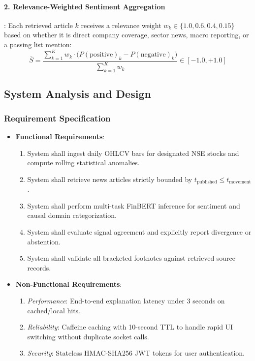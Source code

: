 \documentclass{article}
\begin{document}
	\paragraph{2. Relevance-Weighted Sentiment Aggregation}:
	Each retrieved article $k$ receives a relevance weight $w_k \in \{1.0, 0.6, 0.4, 0.15\}$ based on whether it is direct company coverage, sector news, macro reporting, or a passing list mention:
	\begin{equation}
		\bar{S} = \frac{\sum_{k=1}^K w_k \cdot \Big( P(\text{positive})_k - P(\text{negative})_k \Big)}{\sum_{k=1}^K w_k} \in [-1.0, +1.0]
	\end{equation}

	\subsection{System Analysis and Design}

	\subsubsection{Requirement Specification}
	\begin{itemize}
		\item \textbf{Functional Requirements}:
			\begin{enumerate}
				\item System shall ingest daily OHLCV bars for designated NSE stocks and compute rolling statistical anomalies.
				\item System shall retrieve news articles strictly bounded by $t_{\text{published}} \le t_{\text{movement}}$.
				\item System shall perform multi-task FinBERT inference for sentiment and causal domain categorization.
				\item System shall evaluate signal agreement and explicitly report divergence or abstention.
				\item System shall validate all bracketed footnotes against retrieved source records.
			\end{enumerate}
		\item \textbf{Non-Functional Requirements}:
			\begin{enumerate}
				\item \textit{Performance}: End-to-end explanation latency under 3 seconds on cached/local hits.
				\item \textit{Reliability}: Caffeine caching with 10-second TTL to handle rapid UI switching without duplicate socket calls.
				\item \textit{Security}: Stateless HMAC-SHA256 JWT tokens for user authentication.
			\end{enumerate}
	\end{itemize}
\end{document}
